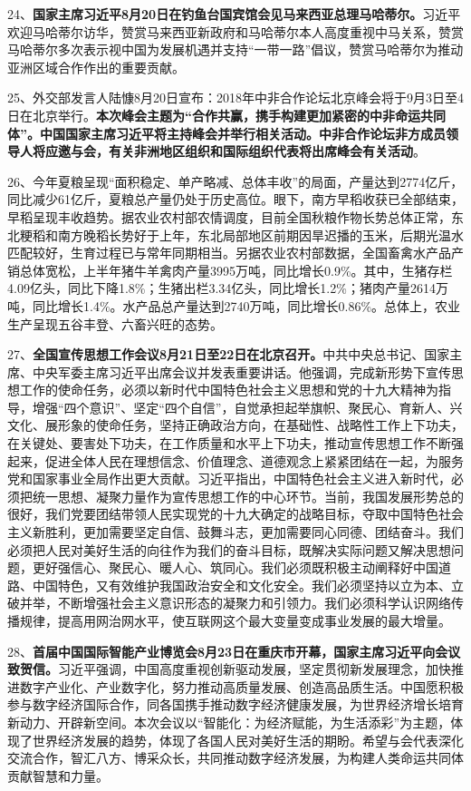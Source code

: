 24、{\textbf{国家主席习近平8月20日在钓鱼台国宾馆会见马来西亚总理马哈蒂尔。}}习近平欢迎马哈蒂尔访华，赞赏马来西亚新政府和马哈蒂尔本人高度重视中马关系，赞赏马哈蒂尔多次表示视中国为发展机遇并支持``一带一路''倡议，赞赏马哈蒂尔为推动亚洲区域合作作出的重要贡献。

25、外交部发言人陆慷8月20日宣布：2018年中非合作论坛北京峰会将于9月3日至4日在北京举行。{\textbf{本次峰会主题为``合作共赢，携手构建更加紧密的中非命运共同体''。中国国家主席习近平将主持峰会并举行相关活动。中非合作论坛非方成员领导人将应邀与会，有关非洲地区组织和国际组织代表将出席峰会有关活动}}。

26、今年夏粮呈现``面积稳定、单产略减、总体丰收''的局面，产量达到2774亿斤，同比减少61亿斤，夏粮总产量仍处于历史高位。眼下，南方早稻收获已全部结束，早稻呈现丰收趋势。据农业农村部农情调度，目前全国秋粮作物长势总体正常，东北粳稻和南方晚稻长势好于上年，东北局部地区前期因旱迟播的玉米，后期光温水匹配较好，生育过程已与常年同期相当。另据农业农村部数据，全国畜禽水产品产销总体宽松，上半年猪牛羊禽肉产量3995万吨，同比增长0.9\%。其中，生猪存栏4.09亿头，同比下降1.8\%；生猪出栏3.34亿头，同比增长1.2\%；猪肉产量2614万吨，同比增长1.4\%。水产品总产量达到2740万吨，同比增长0.86\%。总体上，农业生产呈现五谷丰登、六畜兴旺的态势。

27、{\textbf{全国宣传思想工作会议8月21日至22日在北京召开。}}中共中央总书记、国家主席、中央军委主席习近平出席会议并发表重要讲话。他强调，完成新形势下宣传思想工作的使命任务，必须以新时代中国特色社会主义思想和党的十九大精神为指导，增强``四个意识''、坚定``四个自信''，自觉承担起举旗帜、聚民心、育新人、兴文化、展形象的使命任务，坚持正确政治方向，在基础性、战略性工作上下功夫，在关键处、要害处下功夫，在工作质量和水平上下功夫，推动宣传思想工作不断强起来，促进全体人民在理想信念、价值理念、道德观念上紧紧团结在一起，为服务党和国家事业全局作出更大贡献。习近平指出，中国特色社会主义进入新时代，必须把统一思想、凝聚力量作为宣传思想工作的中心环节。当前，我国发展形势总的很好，我们党要团结带领人民实现党的十九大确定的战略目标，夺取中国特色社会主义新胜利，更加需要坚定自信、鼓舞斗志，更加需要同心同德、团结奋斗。我们必须把人民对美好生活的向往作为我们的奋斗目标，既解决实际问题又解决思想问题，更好强信心、聚民心、暖人心、筑同心。我们必须既积极主动阐释好中国道路、中国特色，又有效维护我国政治安全和文化安全。我们必须坚持以立为本、立破并举，不断增强社会主义意识形态的凝聚力和引领力。我们必须科学认识网络传播规律，提高用网治网水平，使互联网这个最大变量变成事业发展的最大增量。

28、{\textbf{首届中国国际智能产业博览会8月23日在重庆市开幕，国家主席习近平向会议致贺信。}}习近平强调，中国高度重视创新驱动发展，坚定贯彻新发展理念，加快推进数字产业化、产业数字化，努力推动高质量发展、创造高品质生活。中国愿积极参与数字经济国际合作，同各国携手推动数字经济健康发展，为世界经济增长培育新动力、开辟新空间。本次会议以``智能化：为经济赋能，为生活添彩''为主题，体现了世界经济发展的趋势，体现了各国人民对美好生活的期盼。希望与会代表深化交流合作，智汇八方、博采众长，共同推动数字经济发展，为构建人类命运共同体贡献智慧和力量。

